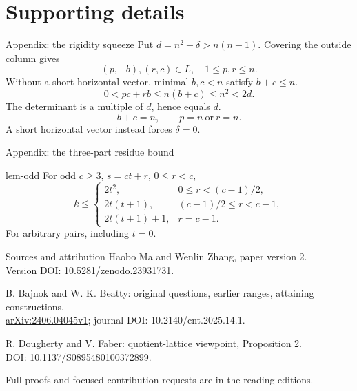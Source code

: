 \documentclass{beamer}
\begin{document}
\section{Supporting details}
\begin{frame}{Appendix: the rigidity squeeze}
Put $d=n^2-\delta>n(n-1)$. Covering the outside column gives
\[(p,-b),(r,c)\in L,\quad1\le p,r\le n.\]
Without a short horizontal vector, minimal $b,c<n$ satisfy $b+c\le n$.
\[0<pc+rb\le n(b+c)\le n^2<2d.\]
The determinant is a multiple of $d$, hence equals $d$.
\[b+c=n,\qquad p=n\ \text{or}\ r=n.\]
A short horizontal vector instead forces $\delta=0$.
\end{frame}
\begin{frame}{Appendix: the three-part residue bound}
\begin{bookresult}{lem-odd}
For odd $c\ge3$, $s=ct+r$, $0\le r<c$,
\[k\le\begin{cases}
2t^2,&0\le r<(c-1)/2,\\
2t(t+1),&(c-1)/2\le r<c-1,\\
2t(t+1)+1,&r=c-1.
\end{cases}\]
For arbitrary pairs, including $t=0$.
\end{bookresult}
\end{frame}
\begin{frame}{Sources and attribution}
\small
Haobo Ma and Wenlin Zhang, paper version 2.\\
\href{https://doi.org/10.5281/zenodo.23931731}{Version DOI: 10.5281/zenodo.23931731}.
\medskip

B. Bajnok and W. K. Beatty: original questions, earlier ranges, attaining constructions.\\
\href{https://arxiv.org/abs/2406.04045v1}{arXiv:2406.04045v1}; journal DOI: 10.2140/cnt.2025.14.1.
\medskip

R. Dougherty and V. Faber: quotient-lattice viewpoint, Proposition 2.\\
DOI: 10.1137/S0895480100372899.
\medskip

Full proofs and focused contribution requests are in the reading editions.
\end{frame}
\FormalVerification
\end{document}
